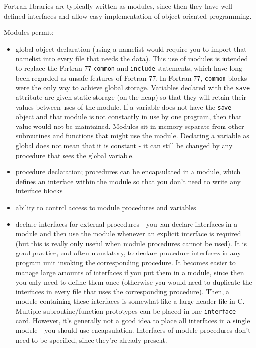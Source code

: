 \documentclass[10pt]{article}
\begin{document}
Fortran libraries are typically written as modules, since then they have well-defined interfaces and allow easy implementation of object-oriented programming. 

Modules permit:

\begin{itemize}
\item global object declaration (using a namelist would require you to import that namelist into every file that needs the data). This use of modules is intended to replace the Fortran 77 {\tt common} and {\tt include} statements, which have long been regarded as unsafe features of Fortran 77. In Fortran 77, {\tt common} blocks were the only way to achieve global storage. Variables declared with the {\tt save} attribute are given static storage (on the heap) so that they will retain their values between uses of the module. If a variable does not have the {\tt save} object and that module is not constantly in use by one program, then that value would not be maintained. Modules sit in memory separate from other subroutines and functions that might use the module. Declaring a variable as global does not mean that it is constant - it can still be changed by any procedure that sees the global variable.
\item procedure declaration; procedures can be encapsulated in a module, which defines an interface within the module so that you don't need to write any interface blocks
\item ability to control access to module procedures and variables
\item declare interfaces for external procedures - you can declare interfaces in a module and then use the module whenever an explicit interface is required (but this is really only useful when module procedures cannot be used). It is good practice, and often mandatory, to declare procedure interfaces in any program unit invoking the corresponding procedure. It becomes easier to manage large amounts of interfaces if you put them in a module, since then you only need to define them once (otherwise you would need to duplicate the interfaces in every file that uses the corresponding procedure). Then, a module containing these interfaces is somewhat like a large header file in C. Multiple subroutine/function prototypes can be placed in one {\tt interface} card. However, it's generally not a good idea to place all interfaces in a single module - you should use encapsulation. Interfaces of module procedures don't need to be specified, since they're already present.
\end{itemize}
\end{document}
